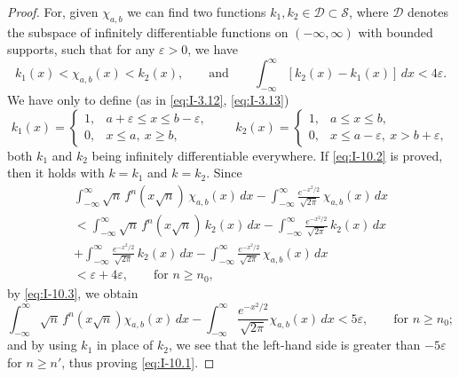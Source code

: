 \begin{proof}
For, given $\chi_{a,b}$ we can find two functions $k_1,k_2\in\mathcal D\subset\mathcal S$, where $\mathcal D$ denotes the subspace of infinitely differentiable functions on $(-\infty,\infty)$ with bounded supports, such that for any $\varepsilon>0$, we have
\begin{equation}\label{eq:I-10.3}\tag{10.3}
k_1(x)<\chi_{a,b}(x)<k_2(x),\qquad\text{and}\qquad
\int_{-\infty}^{\infty}[k_2(x)-k_1(x)]\,dx<4\varepsilon.
\end{equation}
We have only to define (as in \eqref{eq:I-3.12}, \eqref{eq:I-3.13})
\begin{equation}\tag{10.4}\label{eq:I-10.4}
k_1(x)=
\begin{cases}
1,&a+\varepsilon\le x\le b-\varepsilon,\\
0,&x\le a,\ x\ge b,
\end{cases}
\qquad
k_2(x)=
\begin{cases}
1,&a\le x\le b,\\
0,&x\le a-\varepsilon,\ x>b+\varepsilon,
\end{cases}
\end{equation}
both $k_1$ and $k_2$ being infinitely differentiable everywhere. If \eqref{eq:I-10.2} is proved, then it holds with $k=k_1$ and $k=k_2$. Since
\begin{multline*}
\int_{-\infty}^{\infty}\sqrt n\,f^n(x\sqrt n)\,\chi_{a,b}(x)\,dx
-\int_{-\infty}^{\infty}\frac{e^{-x^{2}/2}}{\sqrt{2\pi}}\,\chi_{a,b}(x)\,dx\\
<\int_{-\infty}^{\infty}\sqrt n\,f^n(x\sqrt n)\,k_2(x)\,dx
-\int_{-\infty}^{\infty}\frac{e^{-x^{2}/2}}{\sqrt{2\pi}}\,k_2(x)\,dx\\
+\int_{-\infty}^{\infty}\frac{e^{-x^{2}/2}}{\sqrt{2\pi}}\,k_2(x)\,dx
-\int_{-\infty}^{\infty}\frac{e^{-x^{2}/2}}{\sqrt{2\pi}}\,\chi_{a,b}(x)\,dx\\
<\varepsilon+4\varepsilon,\qquad\text{for }n\ge n_0,
\end{multline*}
by \eqref{eq:I-10.3}, we obtain
\begin{equation*}
\int_{-\infty}^{\infty}\sqrt n\,f^n(x\sqrt n)\chi_{a,b}(x)\,dx
-\int_{-\infty}^{\infty}\frac{e^{-x^{2}/2}}{\sqrt{2\pi}}\chi_{a,b}(x)\,dx<5\varepsilon,\qquad\text{for }n\ge n_0;
\end{equation*}
and by using $k_1$ in place of $k_2$, we see that the left-hand side is greater than $-5\varepsilon$ for $n\ge n'$, thus proving \eqref{eq:I-10.1}.


\end{proof}
